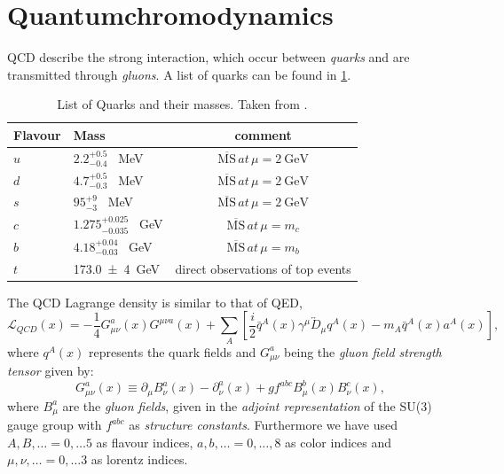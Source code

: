 \documentclass[../../index.tex]{subfiles}
\begin{document}
\section{Quantumchromodynamics}
\label{sec:quantumchromodynamics}
QCD describe the strong interaction, which occur between \textit{quarks} and
are transmitted through \textit{gluons}. A list of quarks can be found in
\cref{table:quarkList}.
\begin{table}
  \centering
  \begin{tabular}{l l c}
    \toprule
    Flavour & Mass & comment\\
    \midrule
    $u$ & $2.2_{-0.4}^{+0.5}$ \SI{}{\mega\eV} & $\overline{\text{MS}} \,at\, \mu=\SI{2}{\giga\eV}$ \\
    $d$ & $4.7_{-0.3}^{+0.5}$ \SI{}{\mega\eV} & $\overline{\text{MS}} \,at\, \mu=\SI{2}{\giga\eV}$ \\
    $s$ & $95_{-3}^{+9}$ \SI{}{\mega\eV} & $\overline{\text{MS}} \,at\, \mu=\SI{2}{\giga\eV}$ \\
    $c$ & $1.275_{-0.035}^{+0.025}$ \SI{}{\giga\eV} & $\overline{\text{MS}} \,at\, \mu=m_c$\\
    $b$ & $4.18_{-0.03}^{+0.04}$ \SI{}{\giga\eV} & $\overline{\text{MS}} \,at\, \mu=m_b$\\
    $t$ & \SI{173.0 \pm 4}{\giga\eV} & direct observations of top events \\
    \bottomrule 
  \end{tabular}
  \caption{List of Quarks and their masses. Taken from \cite{PDG2018}.}
  \label{table:quarkList}
\end{table}

The QCD Lagrange density is similar to that of QED\cite{Jamin2006},
\begin{equation}
  \label{eq:qcdLagrangian}
  \mathcal{L}_{QCD}(x) = -\frac{1}{4}G_{\mu\nu}^a(x)G^{\mu\nu a}(x) + \sum_A \left[ \frac{i}{2} \bar{q}^A(x) \gamma^\mu \overleftrightarrow{D}_\mu q^A(x) - m_A\bar{q}^A(x) a^A(x) \right],
\end{equation}
where $q^A(x)$ represents the quark fields and $G_{\mu\nu}^a$ being the \textit{gluon field strength tensor} given by:
\begin{equation}
  \label{eq:gluonField}
  G_{\mu\nu}^a(x) \equiv \partial_\mu B_\nu^a(x) - \partial_\nu^a(x) + g f^{abc} B_\mu^b(x) B_\nu^c(x),
\end{equation}
where $B_\mu^a$ are the \textit{gluon fields}, given in the \textit{adjoint
  representation} of the SU(3) gauge group with $f^{abc}$ as \textit{structure
  constants}. Furthermore we have used $A, B, \dotsc = 0, \dotsc 5$ as flavour indices, $a,
b, \dotsc = 0, \dotsc, 8 $ as color indices and $\mu, \nu, \dotsc = 0, \dotsc 3$ as lorentz indices.
\end{document}
